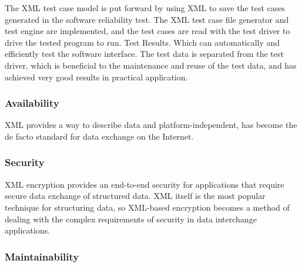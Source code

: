 The XML test case model is put forward by using XML to save the test cases generated in the software reliability test.
The XML test case file generator and test engine are implemented, and the test cases are read with the test driver to drive the tested program to run.
Test Results.
Which can automatically and efficiently test the software interface.
The test data is separated from the test driver, 
which is beneficial to the maintenance and reuse of the test data, and has achieved very good results in practical application.

\subsubsection{Availability}

XML provides a way to describe data and platform-independent,
has become the de facto standard for data exchange on the Internet.

\subsubsection{Security}

XML encryption provides an end-to-end security for applications that require secure data exchange of structured data.
XML itself is the most popular technique for structuring data, so XML-based encryption becomes a method of dealing with the complex requirements of security in data interchange applications.

\subsubsection{Maintainability}

